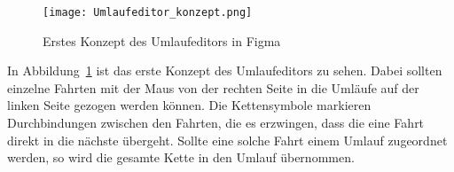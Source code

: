     \begin{figure}[H]
        \centering
        \texttt{[image: Umlaufeditor\_konzept.png]}
        \caption{Erstes Konzept des Umlaufeditors in Figma}
        \label{fig:Umlaufeditor_konzept}
    \end{figure}

    In Abbildung~\ref{fig:Umlaufeditor_konzept} ist das erste Konzept des Umlaufeditors zu sehen. Dabei sollten einzelne Fahrten mit der Maus von der rechten Seite in die Umläufe auf der linken Seite
    gezogen werden können. Die Kettensymbole markieren Durchbindungen zwischen den Fahrten, die es erzwingen, dass die eine Fahrt direkt in die nächste übergeht. Sollte eine solche 
    Fahrt einem Umlauf zugeordnet werden, so wird die gesamte Kette in den Umlauf übernommen.
